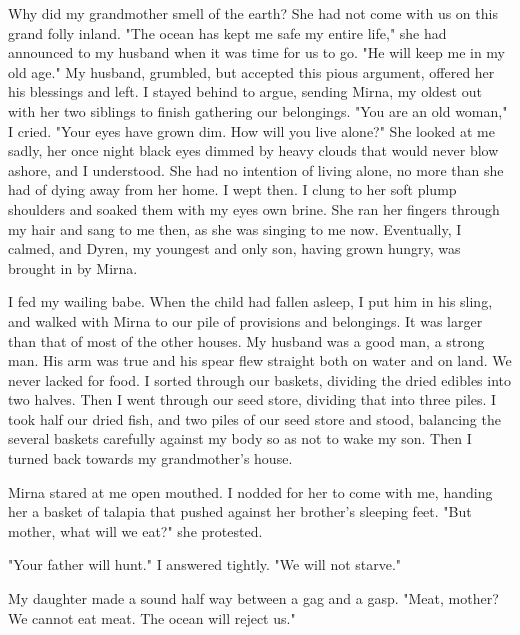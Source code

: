 Why did my grandmother smell of the earth? She had not come with us on this grand folly inland. "The ocean has kept me safe my entire life," she had announced to my husband when it was time for us to go. "He will keep me in my old age." My husband, grumbled, but accepted this pious argument, offered her his blessings and left. I stayed behind to argue, sending Mirna, my oldest out with her two siblings to finish gathering our belongings. "You are an old woman," I cried. "Your eyes have grown dim. How will you live alone?" She looked at me sadly, her once night black eyes dimmed by heavy clouds that would never blow ashore, and I understood. She had no intention of living alone, no more than she had of dying away from her home. I wept then. I clung to her soft plump shoulders and soaked them with my eyes own brine. She ran her fingers through my hair and sang to me then, as she was singing to me now. Eventually, I calmed, and Dyren, my youngest and only son, having grown hungry, was brought in by Mirna.

I fed my wailing babe. When the child had fallen asleep, I put him in his sling, and walked with Mirna to our pile of provisions and belongings. It was larger than that of most of the other houses. My husband was a good man, a strong man. His arm was true and his spear flew straight both on water and on land. We never lacked for food. I sorted through our baskets, dividing the dried edibles into two halves. Then I went through our seed store, dividing that into three piles. I took half our dried fish, and two piles of our seed store and stood, balancing the several baskets carefully against my body so as not to wake my son. Then I turned back towards my grandmother's house.

Mirna stared at me open mouthed. I nodded for her to come with me, handing her a basket of talapia that pushed against her brother's sleeping feet. "But mother, what will we eat?" she protested.

"Your father will hunt." I answered tightly. "We will not starve."

My daughter made a sound half way between a gag and a gasp. "Meat, mother? We cannot eat meat. The ocean will reject us."


